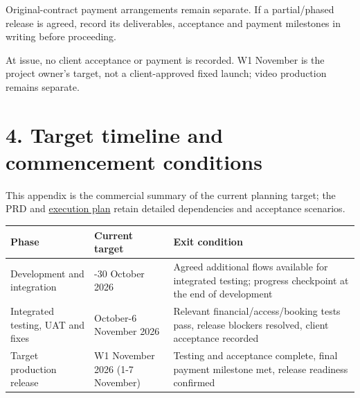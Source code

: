 \documentclass[11pt,a4paper]{article}
\newcounter{none}
\begin{document}
Original-contract payment arrangements remain separate. If a partial/phased release is agreed, record its deliverables, acceptance and payment milestones in writing before proceeding.

At issue, no client acceptance or payment is recorded. W1 November is the project owner's target, not a client-approved fixed launch; video production remains separate.

\section{4. Target timeline and commencement conditions}\label{target-timeline-and-commencement-conditions}

This appendix is the commercial summary of the current planning target; the PRD and \href{../../docs/plans/active/RELEASE-V3-TASKS.md}{execution plan} retain detailed dependencies and acceptance scenarios.

{\def\LTcaptype{none} %
\begin{longtable}[]{@{}
  >{\raggedright\arraybackslash}p{}
  >{\raggedright\arraybackslash}p{}
  >{\raggedright\arraybackslash}p{}@{}}
\toprule\noalign{}
\begin{minipage}[b]{\linewidth}\raggedright
Phase
\end{minipage} & \begin{minipage}[b]{\linewidth}\raggedright
Current target
\end{minipage} & \begin{minipage}[b]{\linewidth}\raggedright
Exit condition
\end{minipage} \\
\midrule\noalign{}
\endhead
\bottomrule\noalign{}
\endlastfoot
Development and integration & 19-30 October 2026 & Agreed additional flows available for integrated testing; progress checkpoint at the end of development \\
Integrated testing, UAT and fixes & 31 October-6 November 2026 & Relevant financial/access/booking tests pass, release blockers resolved, client acceptance recorded \\
Target production release & W1 November 2026 (1-7 November) & Testing and acceptance complete, final payment milestone met, release readiness confirmed \\
\end{longtable}
}
\end{document}
